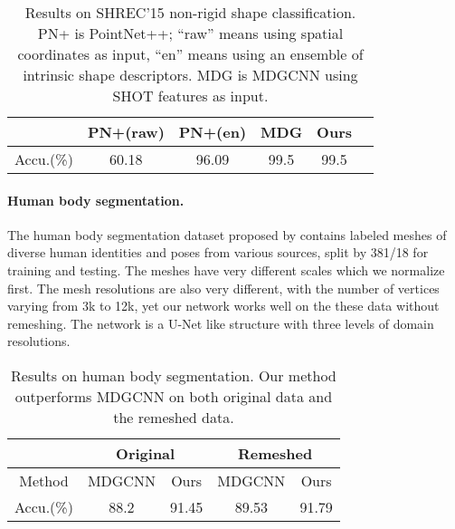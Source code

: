 \documentclass[10pt,twocolumn,letterpaper]{article}
\begin{document}
\begin{table}
	\caption{Results on SHREC'15 non-rigid shape classification. PN+ is PointNet++\cite{qi2017pointnetplusplus}; ``raw'' means using spatial coordinates as input, ``en'' means using an ensemble of intrinsic shape descriptors. MDG is MDGCNN\cite{Poulenard:2018:Multidirectional} using SHOT features as input.}
	\label{tab:shrec15_results}
\centering\footnotesize
	\begin{tabular}{|c|c|c|c|c|c|}
		\hline
		& PN+(raw) & PN+(en) & MDG & Ours  \\ \hline
		Accu.(\%) & 60.18 & 96.09 & 99.5 & 99.5  \\ \hline
	\end{tabular}
	\vspace{-1mm}
\end{table}

\vspace{-4mm}
\paragraph{Human body segmentation.}
The human body segmentation dataset proposed by \cite{Maron:2017:ToricCoverCNN} contains labeled meshes of diverse human identities and poses from various sources, split by 381/18 for training and testing. 
The meshes have very different scales which we normalize first. The mesh resolutions are also very different, with the number of vertices varying from 3k to 12k, yet our network works well on the these data without remeshing.
The network is a U-Net like structure with three levels of domain resolutions.

\begin{table}
	\caption{Results on human body segmentation. Our method outperforms MDGCNN on both original data and the remeshed data.}
	\label{tab:humanbody_segment_results}
	\centering\footnotesize
	\begin{tabular}{|c|c|c|c|c|}
	\hline
	& \multicolumn{2}{|c|}{Original} & \multicolumn{2}{|c|}{Remeshed} \\ \hline
	Method & MDGCNN & Ours & MDGCNN & Ours \\ \hline
	Accu.(\%) & 88.2 & 91.45 & 89.53 & 91.79  \\ \hline
	\end{tabular}
	\vspace{-3mm}
\end{table}
\end{document}
